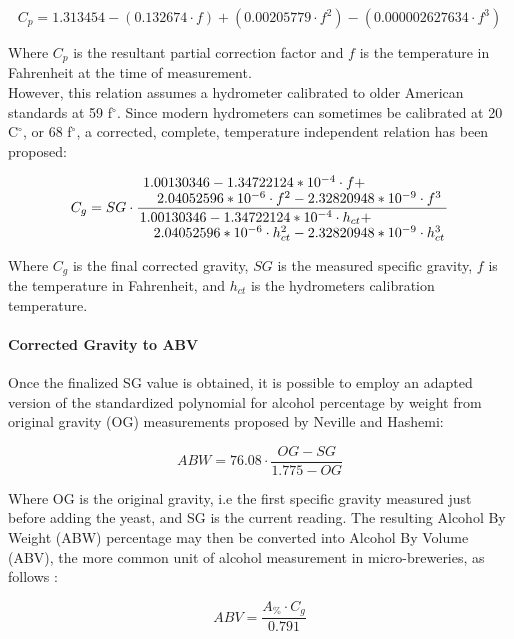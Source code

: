 \documentclass[twoside]{ctuthesis}
\theoremstyle{plain}
\theoremstyle{definition}
\theoremstyle{note}
\begin{document}
\begin{equation}
C_p = 1.313454 - (0.132674\cdot f) + (0.00205779 \cdot f^2) - (0.000002627634 \cdot f^3)
\end{equation}

Where $C_p$ is the resultant partial correction factor and $f$ is the temperature in Fahrenheit at the time of measurement.\\
However, this relation assumes a hydrometer calibrated to older American standards at 59 f$^\circ$. Since modern hydrometers can sometimes be calibrated at 20 C$^\circ$, or 68 f$^\circ$, a corrected, complete, temperature independent relation has been proposed:

\begin{equation}
C_g = SG \cdot \frac{\splitfrac{1.00130346 - 1.34722124*10^{-4} \cdot f + }{2.04052596*10^{-6} \cdot f^2 - 2.32820948*10^{-9} \cdot f^3} }{\splitfrac{1.00130346 - 1.34722124*10^{-4} \cdot h_{ct} +}{ 2.04052596*10^{-6} \cdot h_{ct}^2 - 2.32820948*10^{-9} \cdot h_{ct}^3}}
\end{equation}

Where $C_g$ is the final corrected gravity, $SG$ is the measured specific gravity, $f$ is the temperature in Fahrenheit, and $h_{ct}$ is the hydrometers calibration temperature.\\

\paragraph{Corrected Gravity to ABV}

Once the finalized SG value is obtained, it is possible to employ an adapted version of the standardized polynomial for alcohol percentage by weight from original gravity (OG) measurements proposed by Neville and Hashemi\cite{PH_in_yeast}:

\begin{equation}
ABW = 76.08 \cdot \frac{OG - SG}{1.775-OG}
\end{equation}

Where OG is the original gravity, i.e the first specific gravity measured just before adding the yeast, and SG is the current reading.
The resulting Alcohol By Weight (ABW) percentage may then be converted into Alcohol By Volume (ABV), the more common unit of alcohol measurement in micro-breweries, as follows \cite{Brewing_Science}:

\begin{equation}
	ABV = \frac{A_{\%} \cdot C_g}{0.791}
\end{equation}
\end{document}
